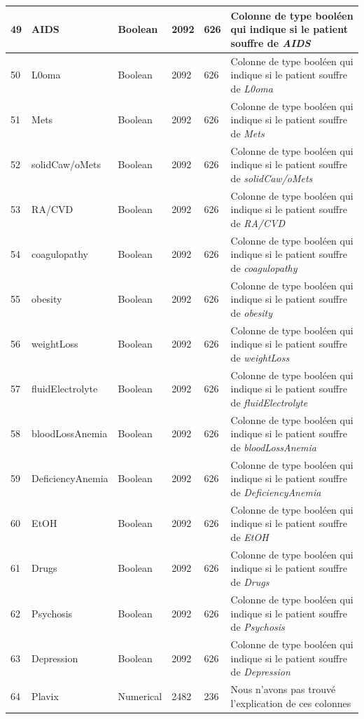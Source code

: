 \documentclass[12pt, french]{report}
\begin{document}
\begin{longtable}{| p{} | p{} | p{} | p{}  | p{} | p{} |  }
49 &	AIDS & Boolean & 2092 & 626& Colonne de type booléen qui indique si le patient souffre  de \textit{AIDS} \\ \hline 
50 &	L0oma & Boolean & 2092 & 626& Colonne de type booléen qui indique si le patient souffre  de \textit{L0oma} \\ \hline 
51 &	Mets & Boolean & 2092 & 626& Colonne de type booléen qui indique si le patient souffre  de \textit{Mets} \\ \hline 
52 &	solidCaw/oMets & Boolean & 2092 & 626& Colonne de type booléen qui indique si le patient souffre  de \textit{solidCaw/oMets} \\ \hline 
53 &	RA/CVD & Boolean & 2092 & 626& Colonne de type booléen qui indique si le patient souffre  de \textit{RA/CVD} \\ \hline 
54 &	coagulopathy & Boolean & 2092 & 626& Colonne de type booléen qui indique si le patient souffre  de \textit{coagulopathy} \\ \hline 
55 &	obesity & Boolean & 2092 & 626& Colonne de type booléen qui indique si le patient souffre  de \textit{obesity} \\ \hline 
56 &	weightLoss & Boolean & 2092 & 626& Colonne de type booléen qui indique si le patient souffre  de \textit{weightLoss} \\ \hline 
57 &	fluidElectrolyte & Boolean & 2092 & 626& Colonne de type booléen qui indique si le patient souffre  de \textit{fluidElectrolyte} \\ \hline 
58 &	bloodLossAnemia & Boolean & 2092 & 626& Colonne de type booléen qui indique si le patient souffre  de \textit{bloodLossAnemia} \\ \hline 
59 &	DeficiencyAnemia & Boolean & 2092 & 626& Colonne de type booléen qui indique si le patient souffre  de \textit{DeficiencyAnemia} \\ \hline 
60 &	EtOH & Boolean & 2092 & 626& Colonne de type booléen qui indique si le patient souffre  de \textit{EtOH} \\ \hline 
61 &	Drugs & Boolean & 2092 & 626& Colonne de type booléen qui indique si le patient souffre  de \textit{Drugs} \\ \hline 
62 &	Psychosis & Boolean & 2092 & 626& Colonne de type booléen qui indique si le patient souffre  de \textit{Psychosis} \\ \hline 
63 &	Depression & Boolean & 2092 & 626& Colonne de type booléen qui indique si le patient souffre  de \textit{Depression} \\ \hline 
64 &	Plavix & Numerical & 2482 & 236 & Nous n’avons pas trouvé l’explication de ces colonnes \\ \hline 

\end{longtable}
\end{document}
